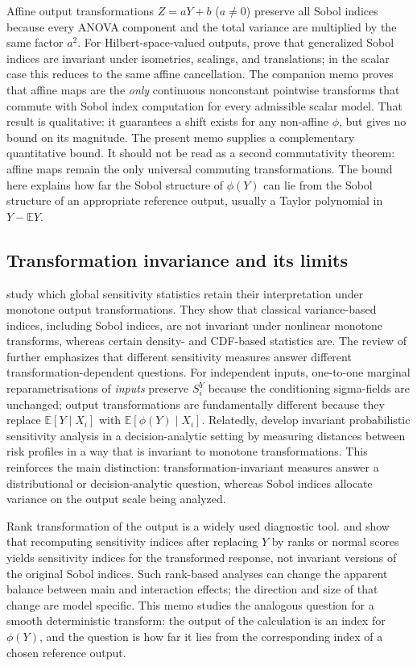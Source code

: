 \documentclass[11pt,letterpaper]{article}
\newcommand{\E}{\mathbb{E}}
\theoremstyle{remark}
\begin{document}
Affine output transformations $Z=aY+b$ ($a\neq 0$) preserve all Sobol indices
because every ANOVA component and the total variance are multiplied by the same
factor $a^2$. For Hilbert-space-valued outputs, \citet{Gamboa2014} prove that
generalized Sobol indices are invariant under isometries, scalings, and
translations; in the scalar case this reduces to the same affine cancellation.
The companion memo proves that affine maps are the \emph{only} continuous
nonconstant pointwise transforms that commute with Sobol index computation for
every admissible scalar model. That result is qualitative: it guarantees a
shift exists for any non-affine $\phi$, but gives no bound on its magnitude.
The present memo supplies a complementary quantitative bound. It should not be
read as a second commutativity theorem: affine maps remain the only universal
commuting transformations. The bound here explains how far the Sobol structure of
$\phi(Y)$ can lie from the Sobol structure of an appropriate reference output,
usually a Taylor polynomial in $Y-\E Y$.

\subsection{Transformation invariance and its limits}

\citet{Borgonovo2014} study which global sensitivity statistics retain their
interpretation under monotone output transformations. They show that classical
variance-based indices, including Sobol indices, are not invariant under
nonlinear monotone transforms, whereas certain density- and CDF-based statistics
are. The review of \citet{Borgonovo2016} further emphasizes that different
sensitivity measures answer different transformation-dependent questions. For
independent inputs, one-to-one marginal reparametrisations of \emph{inputs}
preserve $S_i^Y$ because the conditioning sigma-fields are unchanged; output
transformations are fundamentally different because they replace $\E[Y\mid X_i]$
with $\E[\phi(Y)\mid X_i]$.
Relatedly, \citet{BaucellsBorgonovo2013} develop invariant probabilistic
sensitivity analysis in a decision-analytic setting by measuring distances
between risk profiles in a way that is invariant to monotone transformations.
This reinforces the main distinction: transformation-invariant measures answer a
distributional or decision-analytic question, whereas Sobol indices allocate
variance on the output scale being analyzed.

Rank transformation of the output is a widely used diagnostic tool.
\citet{Iman1988} and \citet{Saltelli1995} show that recomputing sensitivity
indices after replacing $Y$ by ranks or normal scores yields sensitivity indices
for the transformed response, not invariant versions of the original Sobol
indices. Such rank-based analyses can change the apparent balance between main
and interaction effects; the direction and size of that change are model
specific. This memo studies the analogous question for a smooth deterministic
transform: the output of the calculation is an index for $\phi(Y)$, and the
question is how far it lies from the corresponding index of a chosen reference
output.
\end{document}
